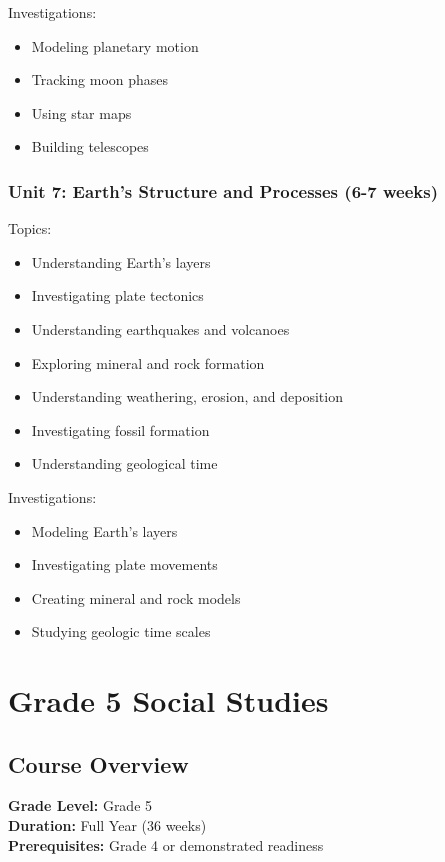 \documentclass[11pt,letterpaper]{report}
\begin{document}
Investigations:
\begin{itemize}
\item Modeling planetary motion
\item Tracking moon phases
\item Using star maps
\item Building telescopes
\end{itemize}

\subsection{Unit 7: Earth's Structure and Processes (6-7 weeks)}

Topics:
\begin{itemize}
\item Understanding Earth's layers
\item Investigating plate tectonics
\item Understanding earthquakes and volcanoes
\item Exploring mineral and rock formation
\item Understanding weathering, erosion, and deposition
\item Investigating fossil formation
\item Understanding geological time
\end{itemize}

Investigations:
\begin{itemize}
\item Modeling Earth's layers
\item Investigating plate movements
\item Creating mineral and rock models
\item Studying geologic time scales
\end{itemize}

\chapter{Grade 5 Social Studies}

\section{Course Overview}

\textbf{Grade Level:} Grade 5\\
\textbf{Duration:} Full Year (36 weeks)\\
\textbf{Prerequisites:} Grade 4 or demonstrated readiness
\end{document}
